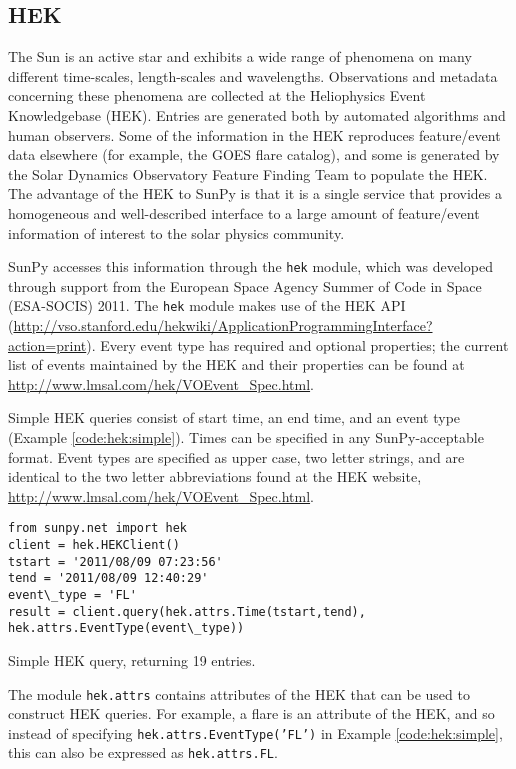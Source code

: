 \subsection{HEK}\label{ssec:hek}

The Sun is an active star and exhibits a wide range of phenomena on
many different time-scales, length-scales and wavelengths.
Observations and metadata concerning these phenomena are collected at
the Heliophysics Event Knowledgebase (HEK).  Entries are generated
both by automated algorithms and human observers.  Some of the
information in the HEK reproduces feature/event data elsewhere (for
example, the GOES flare catalog), and some is generated by the Solar
Dynamics Observatory Feature Finding Team \cite{SDOFFT paper???} to
populate the HEK.  The advantage of the HEK to SunPy is that it is a
single service that provides a homogeneous and well-described
interface to a large amount of feature/event information of interest
to the solar physics community.

SunPy accesses this information through the \texttt{hek} module, which
was developed through support from the European Space Agency Summer of
Code in Space (ESA-SOCIS) 2011.  The \texttt{hek} module makes use of
the HEK API
(\url{http://vso.stanford.edu/hekwiki/ApplicationProgrammingInterface?action=print}).
Every event type has required and optional properties; the current
list of events maintained by the HEK and their properties can be found
at \url{http://www.lmsal.com/hek/VOEvent_Spec.html}.

Simple HEK queries consist of start time, an end time, and an event
type (Example \ref{code:hek:simple}). Times can be specified in any
SunPy-acceptable format. Event types are specified as upper case, two
letter strings, and are identical to the two letter abbreviations
found at the HEK website, \url{http://www.lmsal.com/hek/VOEvent_Spec.html}.

\begin{listing}[H]
\begin{verbatim}
from sunpy.net import hek
client = hek.HEKClient()
tstart = '2011/08/09 07:23:56'
tend = '2011/08/09 12:40:29'
event\_type = 'FL'
result = client.query(hek.attrs.Time(tstart,tend), 
hek.attrs.EventType(event\_type))
\end{verbatim}
\caption{Simple HEK query, returning 19 entries.}
\label{code:hek:simple}
\end{listing}

The module \texttt{hek.attrs} contains attributes of the HEK that can be used to
construct HEK queries.  For example, a flare is an attribute of the
HEK, and so instead of specifying \texttt{hek.attrs.EventType('FL')}
in Example \ref{code:hek:simple}, this can also be expressed as
\texttt{hek.attrs.FL}. 

